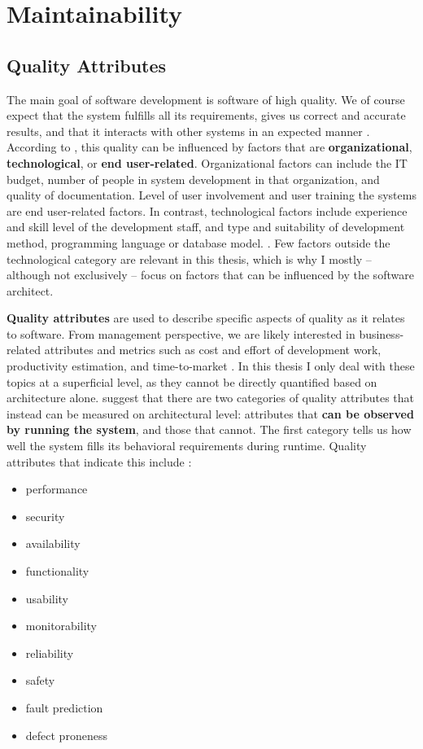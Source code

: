 \documentclass[utf8,english]{gradu3}
\begin{document}
\section{Maintainability}

\subsection{Quality Attributes}

The main goal of software development is software of high quality. We of course
expect that the system fulfills all its requirements, gives us correct and
accurate results, and that it interacts with other systems in an expected manner
\parencite[76]{Bass1998}. According to \textcite[602]{Gorla2010}, this quality
can be influenced by factors that are \textbf{organizational},
\textbf{technological}, or \textbf{end user-related}. Organizational factors can
include the IT budget, number of people in system development in that
organization, and quality of documentation. Level of user involvement and user
training the systems are end user-related factors. In contrast, technological
factors include experience and skill level of the development staff, and type
and suitability of development method, programming language or database model.
\parencite[602]{Gorla2010}. Few factors outside the technological category are
relevant in this thesis, which is why I mostly -- although not exclusively --
focus on factors that can be influenced by the software architect.

\textbf{Quality attributes} are used to describe specific aspects of quality as
it relates to software. From management perspective, we are likely interested in
business-related attributes and metrics such as cost and effort of development
work, productivity estimation, and time-to-market
\parencites[60]{Arvanitou2017}[76]{Bass1998}. In this thesis I only deal with
these topics at a superficial level, as they cannot be directly quantified based
on architecture alone. \textcite[76]{Bass1998} suggest that there are two
categories of quality attributes that instead can be measured on architectural
level: attributes that \textbf{can be observed by running the system}, and those
that cannot. The first category tells us how well the system fills its
behavioral requirements during runtime. Quality attributes that indicate this
include \parencites[79-81]{Bass1998}[13]{Li2021}[60]{Arvanitou2017}:
\begin{itemize}
  \item performance
  \item security
  \item availability
  \item functionality
  \item usability
  \item monitorability
  \item reliability
  \item safety
  \item fault prediction
  \item defect proneness
\end{itemize}
\end{document}
